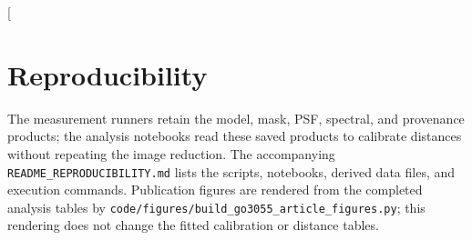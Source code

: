 \documentclass[nodoi,nocopyright]{pas}
\begin{document}
\FloatBarrier
\twocolumn[{
\begin{minipage}{\textwidth}
\section{Reproducibility}
\label{app:reproducibility}

The measurement runners retain the model, mask, PSF, spectral, and provenance
products; the analysis notebooks read these saved products to calibrate
distances without repeating the image reduction. The accompanying
\nolinkurl{README_REPRODUCIBILITY.md} lists the scripts, notebooks, derived
data files, and execution commands. Publication figures are rendered from
the completed analysis tables by
\nolinkurl{code/figures/build_go3055_article_figures.py}; this rendering does not
change the fitted calibration or distance tables.


\end{minipage}}
\end{document}
